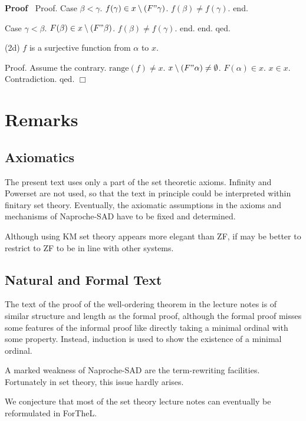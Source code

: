 \documentclass{article}
\newenvironment{forthel}{\begin{leftbar}}{\end{leftbar}}
\newenvironment{proof}{\noindent\textbf{Proof\ }}{\hspace*{\fill}$\Box$\medskip}
\begin{document}
\begin{forthel}
\begin{proof}
        Proof. 
          Case $\beta < \gamma$. 
            $f(\gamma) \in x \setminus (F " \gamma)$.  
            $f(\beta) \neq f(\gamma)$. 
          end.

          Case $\gamma < \beta$. 
            $F(\beta) \in x \setminus (F " \beta)$. 
            $f(\beta) \neq f(\gamma)$. 
          end.
        end.   
      qed.

(2d) $f$ is a surjective function from $\alpha$ to $x$.

Proof. Assume the contrary.
$\mathrm{range}(f) \neq x$.
$x \setminus (F " \alpha) \neq \emptyset$.
$F(\alpha) \in x$.
$x \in x$. Contradiction.
qed.
\end{proof}
\end{forthel}

\section{Remarks}
\subsection{Axiomatics}

The present text uses only a part of the set theoretic axioms.
Infinity and Powerset are not used, so that the text in principle
could be interpreted within finitary set theory. Eventually,
the axiomatic assumptions in the axioms and mechanisms of
Naproche-SAD have to be fixed and determined.

Although using KM set theory appears more elegant than ZF, if may
be better to restrict to ZF to be in line with other systems.

\subsection{Natural and Formal Text}

The text of the proof of the well-ordering theorem in the lecture
notes is of similar structure and length as the formal proof,
although the formal proof misses some features of the informal
proof like directly taking a minimal ordinal with some property. Instead, induction is used to show the existence of a minimal ordinal.

A marked weakness of Naproche-SAD are the term-rewriting facilities. Fortunately in set theory, this issue hardly arises.

We conjecture that most of the set theory lecture
notes can eventually be reformulated in ForTheL. 
\end{document}

